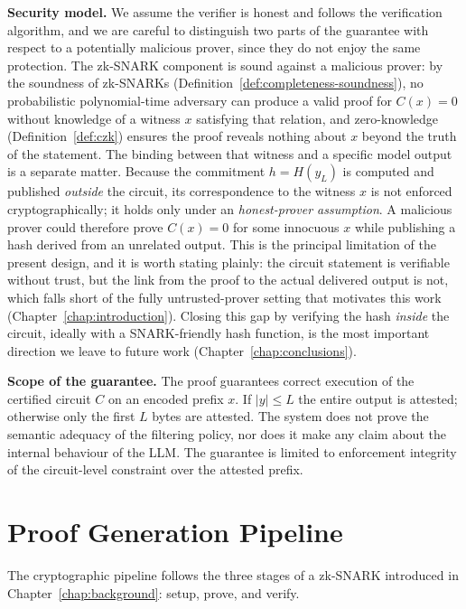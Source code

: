 \medskip

\textbf{Security model.} We assume the verifier is honest and follows the verification algorithm, and we are careful to distinguish two parts of the guarantee with respect to a potentially malicious prover, since they do not enjoy the same protection. The zk-SNARK component is sound against a malicious prover: by the soundness of zk-SNARKs (Definition~\ref{def:completeness-soundness}), no probabilistic polynomial-time adversary can produce a valid proof for $C(x) = 0$ without knowledge of a witness $x$ satisfying that relation, and zero-knowledge (Definition~\ref{def:czk}) ensures the proof reveals nothing about $x$ beyond the truth of the statement. The binding between that witness and a specific model output is a separate matter. Because the commitment $h = H(y_L)$ is computed and published \emph{outside} the circuit, its correspondence to the witness $x$ is not enforced cryptographically; it holds only under an \emph{honest-prover assumption}. A malicious prover could therefore prove $C(x) = 0$ for some innocuous $x$ while publishing a hash derived from an unrelated output. This is the principal limitation of the present design, and it is worth stating plainly: the circuit statement is verifiable without trust, but the link from the proof to the actual delivered output is not, which falls short of the fully untrusted-prover setting that motivates this work (Chapter~\ref{chap:introduction}). Closing this gap by verifying the hash \emph{inside} the circuit, ideally with a SNARK-friendly hash function, is the most important direction we leave to future work (Chapter~\ref{chap:conclusions}).

\medskip

\textbf{Scope of the guarantee.} The proof guarantees correct execution of the certified circuit $C$ on an encoded prefix $x$. If $|y| \le L$ the entire output is attested; otherwise only the first $L$ bytes are attested. The system does not prove the semantic adequacy of the filtering policy, nor does it make any claim about the internal behaviour of the LLM. The guarantee is limited to enforcement integrity of the circuit-level constraint over the attested prefix.

\section{Proof Generation Pipeline}
\label{sec:sd-pipeline}

The cryptographic pipeline follows the three stages of a zk-SNARK introduced in Chapter~\ref{chap:background}: setup, prove, and verify.

